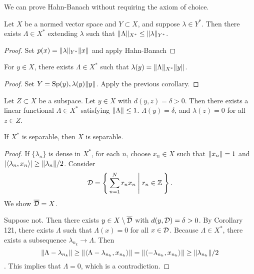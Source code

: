 \documentclass[10pt, twoside]{article}
\begin{document}
    \begin{rmk} We can prove Hahn-Banach without requiring the axiom of choice.
    \end{rmk}

    \begin{cor} Let $X$ be a normed vector space and $Y \subset X$, and suppose
        $\lambda \in Y^*$.  Then there exists $\Lambda \in X^*$ extending
        $\lambda$ such that $\lVert\Lambda\rVert_{X^*} \leq \lVert\lambda\rVert_{Y^*}$.
        \begin{proof} Set $p(x) = \lVert\lambda\rVert_{Y^*} \lVert x\rVert$ and apply
            Hahn-Banach \end{proof} \end{cor}

    \begin{cor} For $y \in X$, there exists $\Lambda \in X^*$ such that
        $\lambda(y) = \lVert\Lambda\rVert_{X^*} \lVert y\rVert$.  \begin{proof} Set $Y =
        \mathrm{Sp}(y), \lambda(y) \lVert y\rVert$. Apply the previous corollary.
    \end{proof} \end{cor}

    \begin{cor} Let $Z \subset X$ be a subspace. Let $y \in X$ with $d(y,z) =
        \delta > 0$. Then there exists a linear functional $\Lambda \in X^*$
        satisfying $\lVert\Lambda\rVert \leq 1$. $\Lambda(y) = \delta$, and
        $\lambda(z) = 0$ for all $z \in Z$.  \end{cor}

    \begin{thm} If $X^*$ is separable, then $X$ is separable.  \begin{proof} If
        $\{\lambda_n\}$ is dense in $X^*$, for each $n$, choose $x_n \in X$
        such that $\lVert x_n\rVert = 1$ and $\lvert\langle\lambda_n, x_n\rangle\rvert \geq
        \lVert\lambda_n\rVert/2$. Consider \[\mathcal{D} = \Set{\sum_{n=1}^N r_nx_n
        | r_n \in \mathbb{Z}}. \] We show $\overline{\mathcal{D}} = X$.

            Suppose not. Then there exists $y \in X \setminus
            \overline{\mathcal{D}}$ with $d(y, \mathcal{D}) = \delta > 0$. By Corollary
            121, there exists $\Lambda$ such that $\Lambda(x) = 0$ for all $x
            \in \mathcal{D}$. Because $\Lambda \in X^*$, there exists a subsequence
            $\lambda_{n_k} \to \Lambda$. Then \[\lVert\Lambda - \lambda_{n_k}\rVert
            \geq \lVert\langle\Lambda - \lambda_{n_k}, x_{n_k}\rangle\rVert =
        \lVert\langle-\lambda_{n_k}, x_{n_k}\rangle\rVert \geq \lVert\lambda_{n_k}\rVert/2\].
    This implies that $\Lambda = 0$, which is a contradiction.  \end{proof}
\end{thm}
\end{document}
